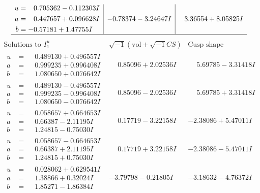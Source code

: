 \documentclass[1p]{elsarticle_modified}
\theoremstyle{definition}
\newcommand{\I}{\sqrt{-1}}
\begin{document}
$$\begin{array}{c|c|c}
\begin{aligned}
u &= \phantom{-}0.705362 - 0.112303 I \\
a &= \phantom{-}0.447657 + 0.096628 I \\
b &= -0.57181 + 1.47755 I\end{aligned}
 & -0.78374 - 3.24647 I & \phantom{-}3.36554 + 8.05825 I\\
 \hline 
 \end{array}$$\newpage$$\begin{array}{c|c|c}  
\text{Solutions to }I^u_{1}& \I (\text{vol} + \sqrt{-1}CS) & \text{Cusp shape}\\
 \hline 
\begin{aligned}
u &= \phantom{-}0.489130 + 0.496557 I \\
a &= \phantom{-}0.999235 + 0.996408 I \\
b &= \phantom{-}1.080650 + 0.076642 I\end{aligned}
 & \phantom{-}0.85096 + 2.02536 I & \phantom{-}5.69785 - 3.31418 I \\ \hline\begin{aligned}
u &= \phantom{-}0.489130 - 0.496557 I \\
a &= \phantom{-}0.999235 - 0.996408 I \\
b &= \phantom{-}1.080650 - 0.076642 I\end{aligned}
 & \phantom{-}0.85096 - 2.02536 I & \phantom{-}5.69785 + 3.31418 I \\ \hline\begin{aligned}
u &= \phantom{-}0.058657 + 0.664653 I \\
a &= \phantom{-}0.66387 - 2.11195 I \\
b &= \phantom{-}1.24815 - 0.75030 I\end{aligned}
 & \phantom{-}0.17719 - 3.22158 I & -2.38086 + 5.47011 I \\ \hline\begin{aligned}
u &= \phantom{-}0.058657 - 0.664653 I \\
a &= \phantom{-}0.66387 + 2.11195 I \\
b &= \phantom{-}1.24815 + 0.75030 I\end{aligned}
 & \phantom{-}0.17719 + 3.22158 I & -2.38086 - 5.47011 I \\ \hline\begin{aligned}
u &= \phantom{-}0.028062 + 0.629541 I \\
a &= \phantom{-}1.38866 + 0.32024 I \\
b &= \phantom{-}1.85271 - 1.86384 I\end{aligned}
 & -3.79798 - 0.21805 I & -3.18632 - 4.76372 I \\ \hline\begin{aligned}

\end{aligned}
\end{array}$$
\end{document}
